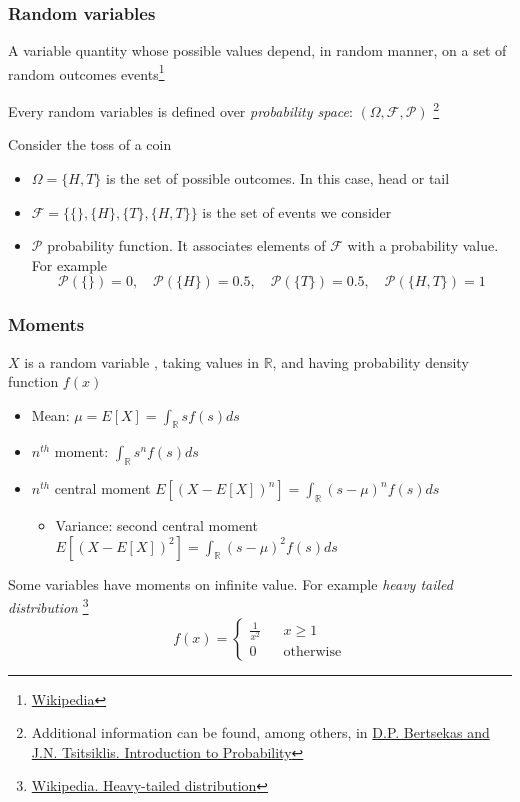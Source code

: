 \begin{frame}
	\frametitle{Random variables}
	A variable quantity whose possible values depend, in random manner, on a set of random outcomes events\footnote{\href{https://en.wikipedia.org/wiki/Random_variable}{Wikipedia}}\vspace{1em}
	
	Every random variables is defined over \emph{probability space}: $(\Omega, \mathcal{F}, \mathcal{P})$ \footnote{Additional information can be found, among others, in \href{http://vfu.bg/en/e-Learning/Math--Bertsekas_Tsitsiklis_Introduction_to_probability.pdf}{D.P. Bertsekas and J.N. Tsitsiklis. Introduction to Probability}}\vspace{1em}
	
	Consider the toss of a coin
	\begin{itemize}
		\item $\Omega=\{H, T\}$ is the set of possible outcomes. In this case, head or tail
		\item $\mathcal{F}=\{\{\}, \{H\}, \{T\}, \{H,T\}\}$ is the set of events we consider
		\item $\mathcal{P}$ probability function. It associates elements of $\mathcal{F}$ with a probability value. For example $$\mathcal{P}(\{\})=0,\quad\mathcal{P}(\{H\})=0.5, \quad\mathcal{P}(\{T\})=0.5, \quad \mathcal{P}(\{H, T\})=1$$
	\end{itemize}
\end{frame}

\begin{frame}
	\frametitle{Moments}
	$X$ is a random variable , taking values in $\mathbb{R}$, and having probability density function $f(x)$
	\begin{itemize}
		\item Mean: $\mu=E[X]=\int_\mathbb{R} sf(s)ds$
		\item $n^{th}$ moment: $\int_\mathbb{R} s^nf(s)ds$ 
		\item $n^{th}$ central moment $E[(X-E[X])^n]=\int_\mathbb{R} (s-\mu)^nf(s)ds$
		\begin{itemize}
			\item Variance: second central moment $E[(X-E[X])^2]=\int_\mathbb{R} (s-\mu)^2f(s)ds$
		\end{itemize}
	\end{itemize}
	
	\vspace{1em}
	Some variables have moments on infinite value. For example \emph{heavy tailed distribution} \footnote{\href{https://en.wikipedia.org/wiki/Heavy-tailed_distribution}{\small{ Wikipedia. Heavy-tailed distribution}}} 
	$$f(x)=\left\{\begin{aligned}
					\frac{1}{x^2} && x \geq 1\\
					0&&\textrm{otherwise}
				   \end{aligned}
	\right.$$
\end{frame}

